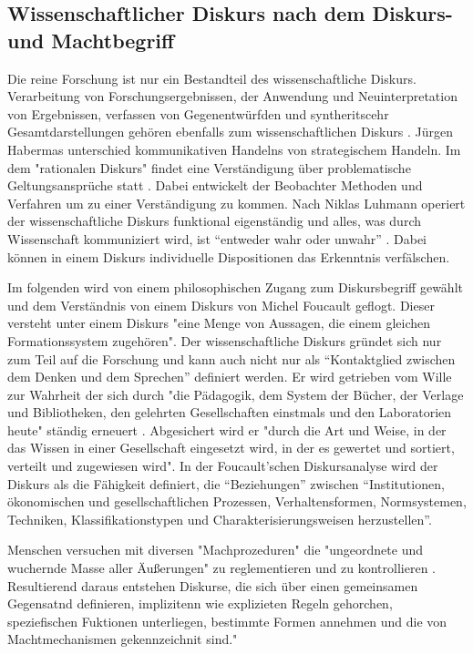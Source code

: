 \subsection{Wissenschaftlicher Diskurs nach dem Diskurs- und Machtbegriff}

Die reine Forschung ist nur ein Bestandteil des wissenschaftliche Diskurs\cite{suchen}. Verarbeitung von Forschungsergebnissen, der Anwendung und Neuinterpretation von Ergebnissen, verfassen von Gegenentwürfden und syntheritscehr Gesamtdarstellungen gehören ebenfalls zum wissenschaftlichen Diskurs \cite{suchen}. Jürgen Habermas unterschied kommunikativen Handelns von strategischem Handeln. Im dem "rationalen Diskurs" findet eine Verständigung über problematische Geltungsansprüche statt \cite{suchen}. Dabei entwickelt der Beobachter Methoden und Verfahren um zu einer Verständigung zu kommen. \cite{suchen} Nach Niklas Luhmann operiert der wissenschaftliche Diskurs funktional eigenständig und alles, was durch Wissenschaft kommuniziert wird, ist “entweder wahr oder unwahr” \cite{Luhmann1998}.  Dabei können in einem Diskurs individuelle Dispositionen das Erkenntnis verfälschen.

Im folgenden wird von einem philosophischen Zugang zum Diskursbegriff gewählt und dem Verständnis von einem Diskurs von Michel Foucault geflogt. Dieser versteht unter einem Diskurs "eine Menge von Aussagen, die einem gleichen Formationssystem zugehören"\cite{foucault_archaologie_1981}. Der wissenschaftliche Diskurs gründet sich nur zum Teil auf die Forschung und kann auch nicht nur als “Kontaktglied zwischen dem Denken und dem Sprechen” \cite{foucault_ordnung_2003} definiert werden. Er wird getrieben vom Wille zur Wahrheit der sich durch "die Pädagogik, dem System der Bücher, der Verlage und Bibliotheken, den gelehrten Gesellschaften einstmals und den Laboratorien heute" ständig erneuert \cite{foucault_ordnung_2003}. Abgesichert wird er "durch die Art und Weise, in der das Wissen in einer Gesellschaft eingesetzt wird, in der es gewertet und sortiert, verteilt und zugewiesen wird"\cite{foucault_ordnung_2003}. In der Foucault'schen Diskursanalyse wird der Diskurs als die Fähigkeit definiert, die “Beziehungen” zwischen “Institutionen, ökonomischen und gesellschaftlichen Prozessen, Verhaltensformen, Normsystemen, Techniken, Klassifikationstypen und Charakterisierungsweisen herzustellen”\cite{foucault_archaologie_1981}.

Menschen versuchen mit diversen "Machprozeduren" die "ungeordnete und wuchernde Masse aller Äußerungen" zu reglementieren und zu kontrollieren \cite{Neymeyer_diskurs_2010}. Resultierend daraus entstehen Diskurse, die sich über einen gemeinsamen Gegensatnd definieren, implizitenn wie explizieten Regeln gehorchen, speziefischen Fuktionen unterliegen, bestimmte Formen annehmen und die von Machtmechanismen gekennzeichnit sind." \cite{Neymeyer_diskurs_2010}

